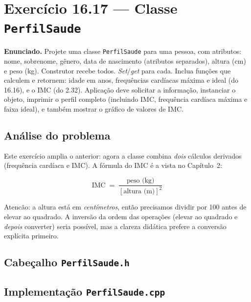 \documentclass[11pt,a4paper]{article}
\begin{document}
\section{Exerc\'icio 16.17 --- Classe \texttt{PerfilSaude}}

\begin{enunciado}
\textbf{Enunciado.} Projete uma classe \texttt{PerfilSaude} para uma pessoa, com atributos: nome, sobrenome, g\^enero, data de nascimento (atributos separados), altura (cm) e peso (kg). Construtor recebe todos. \emph{Set}/\emph{get} para cada. Inclua fun\c{c}\~oes que calculem e retornem: idade em anos, frequ\^encias card\'iacas m\'axima e ideal (do 16.16), e o IMC (do 2.32). Aplica\c{c}\~ao deve solicitar a informa\c{c}\~ao, instanciar o objeto, imprimir o perfil completo (incluindo IMC, frequ\^encia card\'iaca m\'axima e faixa ideal), e tamb\'em mostrar o gr\'afico de valores de IMC.
\end{enunciado}

\subsection*{An\'alise do problema}

Este exerc\'icio amplia o anterior: agora a classe combina \emph{dois} c\'alculos derivados (frequ\^encia card\'iaca e IMC). A f\'ormula do IMC \'e a vista no Cap\'itulo~2:

\begin{equation*}
\mathrm{IMC} \;=\; \frac{\text{peso (kg)}}{[\text{altura (m)}]^{2}}
\end{equation*}

Atenc\~ao: a altura est\'a em \emph{cent\'imetros}, ent\~ao precisamos dividir por 100 antes de elevar ao quadrado. A invers\~ao da ordem das opera\c{c}\~oes (elevar ao quadrado e \emph{depois} converter) seria poss\'ivel, mas a clareza did\'atica prefere a convers\~ao expl\'icita primeiro.

\subsection*{Cabe\c{c}alho \texttt{PerfilSaude.h}}



\subsection*{Implementa\c{c}\~ao \texttt{PerfilSaude.cpp}}
\end{document}
